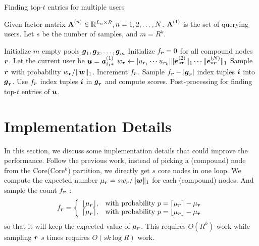\documentclass[10pt,journal,compsoc]{IEEEtran}
\newcommand{\V}[1]{{\boldsymbol{{\MakeLowercase{#1}}}}}
\newcommand{\ColVec}[3]{\V{#1}^{(#2)}_{#3}}
\newcommand{\NormColE}[2]{\norm{\ColVec{e}{#1}{*\V{#2}}}{1}}
\newcommand{\RowVecA}[1]{\V{a}^{(#1)}_{i_#1*}}
\newcommand{\M}[1]{{\textbf{{\MakeUppercase{#1}}}}}
\newcommand{\FacMat}[2]{\M{#1}^{(#2)}}
\newcommand{\norm}[2]{\|#1\|_{#2}}
\begin{document}
\begin{algorithm}
	\caption{Finding top-$t$ entries for multiple users}
	\label{alg:MultiUsersSampling}
	Given factor matrix $\FacMat{A}{n}\in \mathbb{R}^{L_n\times R}, n = 1,2,\ldots,N$.
	$\FacMat{A}{1}$ is the set of querying users.
	Let $s$ be the number of samples, and $m=R^k$.
	\begin{algorithmic}[1]
		\State Initialize $m$ empty pools $\V{g}_1,\V{g}_2,\ldots,\V{g}_m$
		\State Initialize $f_{\V{r}} = 0$ for all compound nodes $\V{r}$.
		\State Let the current user be $\V{u}=\RowVecA{1}$
		\ForAll{$\V{r}=(r_1,\ldots,r_k)$}
		\State $w_\V{r} \leftarrow |u_{r_1}\cdots u_{r_k}|\NormColE{2}{r} \cdots \NormColE{N}{r}$
		\EndFor
		\State Sample $\V{r}$ with probability $w_\V{r}/\norm{\V{W}}{1}$.
		\label{line:Indexes}
		\State  Increment $f_{\V{r}}$.
		\EndFor
		\ForAll {$\V{r}$}
		\If {$f_\V{r} > |\V{g}_\V{r}|$ }
		\State Sample $f_{\V{r}} - |\V{g}_{\V{r}}|$ index tuples $\V{i}$ into $\V{g}_{\V{r}}$.
		\EndIf
		\State Use $f_{\V{r}}$ index tuples $\V{i}$ in $\V{g}_{\V{r}}$ and compute scores.
		\EndFor
		\State Post-processing for finding top-$t$ entries of $\V{u}$.
		\EndFor
	\end{algorithmic}
\end{algorithm}

\section{Implementation Details}

In this section, we discuss some implementation details that could improve the performance.
Follow the previous work\cite{Cohen97}, instead of picking a (compound) node from the Core(Core$^k$) partition, we directly get $s$ core nodes in one loop. We compute the expected number $\mu_{\V{r}}=sw_\V{r}/\norm{\V{w}}{1}$ for each (compound) nodes. And sample the count $f_\V{r}$ :
\begin{equation}f_\V{r}=
\left\{
\begin{array}{ll}
	\lfloor \mu_{\V{r}} \rfloor, & \hbox {with probability $p=\lceil \mu_{\V{r}} \rceil - \mu_{\V{r}}$}  \\
	\lceil \mu_{\V{r}} \rceil,   & \hbox{with probability $p=\lfloor \mu_{\V{r}} \rfloor - \mu_{\V{r}}$}
\end{array}
\right.
\end{equation}
so that it will keep the expected value of $\mu_{\V{r}}$. This requires $O(R^k)$ work while sampling $\V{r}$ $s$ times requires $O(sk\log R)$ work.
\end{document}
